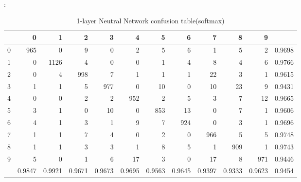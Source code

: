 \documentclass[8pt]{beamer}
\begin{document}
\begin{frame}[allowframebreaks]{\secname : \subsecname}{\subsubsecname}
\begin{table}[htbp]
\tiny
  \centering
  \caption{1-layer Neutral Network confusion table(softmax)}
\begin{tabular}{|r|rrrrrrrrrr|r|}
\hline
  & 0 & 1 & 2 & 3 & 4 & 5 & 6 & 7 & 8 & 9 &  \\
\hline
0 & 965 & 0 & 9 & 0 & 2 & 5 & 6 & 1 & 5 & 2 & 0.9698 \\
1 & 0 & 1126 & 4 & 0 & 0 & 1 & 4 & 8 & 4 & 6 & 0.9766 \\
2 & 0 & 4 & 998 & 7 & 1 & 1 & 1 & 22 & 3 & 1 & 0.9615 \\
3 & 1 & 1 & 5 & 977 & 0 & 10 & 0 & 10 & 23 & 9 & 0.9431 \\
4 & 0 & 0 & 2 & 2 & 952 & 2 & 5 & 3 & 7 & 12 & 0.9665 \\
5 & 3 & 1 & 0 & 10 & 0 & 853 & 13 & 0 & 7 & 1 & 0.9606 \\
6 & 4 & 1 & 3 & 1 & 9 & 7 & 924 & 0 & 3 & 1 & 0.9696 \\
7 & 1 & 1 & 7 & 4 & 0 & 2 & 0 & 966 & 5 & 5 & 0.9748 \\
8 & 1 & 1 & 3 & 3 & 1 & 8 & 5 & 1 & 909 & 1 & 0.9743 \\
9 & 5 & 0 & 1 & 6 & 17 & 3 & 0 & 17 & 8 & 971 & 0.9446 \\
\hline
  & 0.9847 & 0.9921 & 0.9671 & 0.9673 & 0.9695 & 0.9563 & 0.9645 & 0.9397 & 0.9333 & 0.9623 & 0.9454 \\
\hline
\end{tabular}%
  \label{1-layer Neutral Network confusion table(softmax)}%
\end{table}%
\end{frame}
\end{document}
